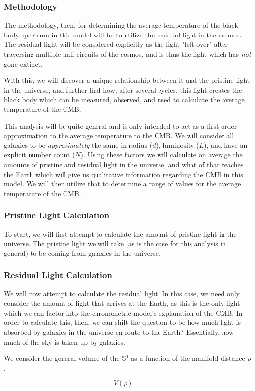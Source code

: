 \documentclass[a4paper]{article}
\begin{document}
    \subsubsection{Methodology}
    
    The  methodology, then, for determining the average temperature of the black body
    spectrum in this model will be to utilize the residual light in the cosmos.
    The residual light will be considered explicitly as the light "left over"
    after traversing multiple half circuits of the cosmos, and is thus the
    light which has \textit{not} gone extinct.  

    With this, we will discover a unique relationship between it and the
    pristine light in the universe, and further find how, after several cycles,
    this light creates the black body which can be measured, observed, and
    used to calculate the average temperature of the CMB.

    This analysis will be quite general and is only intended to act as a first
    order approximation to the average temperature to the CMB. We will consider
    all galaxies to be \textit{approximately} the same in radius ($d$),
    luminosity ($L$), and have an explicit number count ($N$). Using these
    factors we will calculate on average the amounts of pristine and residual
    light in the universe, and what of that reaches the Earth which will give
    us qualitative information regarding the CMB in this model. We will then
    utilize that to determine a range of values for the average temperature of
    the CMB.

    \subsubsection{Pristine Light Calculation}

    To start, we will first attempt to calculate the amount of pristine light
    in the universe. The pristine light we will take (as is the case for this
    analysis in general) to be coming from galaxies in the universe.
    \subsubsection{Residual Light Calculation}

    We will now attempt to calculate the residual light. In this case, we need
    only consider the amount of light that arrives at the Earth, as this is the
    only light which we can factor into the chronometric model's explanation of
    the CMB. In order to calculate this, then, we can shift the question to be
    how much light is absorbed by galaxies in the universe en route to the
    Earth? Essentially, how much of the sky is taken up by galaxies.

    We consider the general volume of the $\mathbb{S}^3$ as a function of the
    manifold distance $\rho$.

    \begin{equation}
        V(\rho) = 
    \end{equation}
\end{document}
